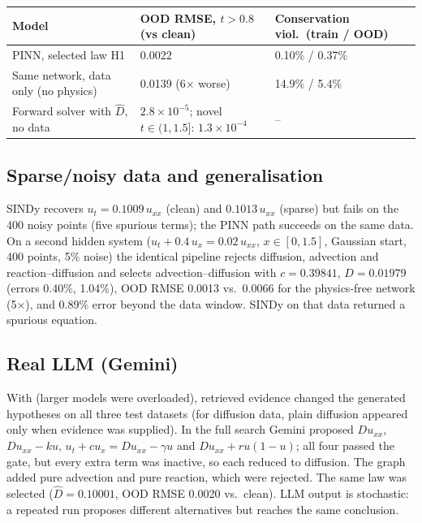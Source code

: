 \documentclass[11pt,a4paper]{article}
\begin{document}
\begin{center}
\small
\begin{tabular}{@{}L{5.4cm}L{5.4cm}L{4.6cm}@{}}
\toprule
\textbf{Model} & \textbf{OOD RMSE, $t>0.8$ (vs clean)} & \textbf{Conservation viol.\ (train / OOD)} \\ \midrule
PINN, selected law H1 & 0.0022 & 0.10\% / 0.37\% \\
Same network, data only (no physics) & 0.0139 (6$\times$ worse) & 14.9\% / 5.4\% \\
Forward solver with $\hat D$, no data & $2.8\times10^{-5}$; novel $t\in(1,1.5]$: $1.3\times10^{-4}$ & -- \\
\bottomrule
\end{tabular}
\end{center}

\subsection{Sparse/noisy data and generalisation}

SINDy recovers $u_t = 0.1009\,u_{xx}$ (clean) and $0.1013\,u_{xx}$ (sparse) but fails on the 400 noisy points
(five spurious terms); the PINN path succeeds on the same data. On a second hidden system
($u_t + 0.4\,u_x = 0.02\,u_{xx}$, $x\in[0,1.5]$, Gaussian start, 400 points, 5\% noise) the identical pipeline rejects
diffusion, advection and reaction--diffusion and selects advection--diffusion with $c=0.39841$, $D=0.01979$ (errors
0.40\%, 1.04\%), OOD RMSE 0.0013 vs.\ 0.0066 for the physics-free network (5$\times$), and 0.89\% error beyond the data
window.
SINDy on that data returned a spurious equation.

\subsection{Real LLM (Gemini)}

With  (larger models were overloaded), retrieved evidence changed the generated hypotheses on
all three test datasets (for diffusion data, plain diffusion appeared only when evidence was supplied). In the full
search Gemini proposed $D u_{xx}$, $D u_{xx} - k u$, $u_t + c u_x = D u_{xx} - \gamma u$ and $D u_{xx} + r u(1-u)$; all
four passed the gate, but every extra term was inactive, so each reduced to diffusion. The graph added pure advection
and pure reaction, which were rejected. The same law was selected ($\hat D = 0.10001$, OOD RMSE 0.0020 vs.\ clean).
LLM output is stochastic: a repeated run proposes different alternatives but reaches the same conclusion.
\end{document}
